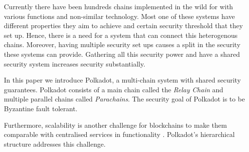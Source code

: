 Currently there have been hundreds chains implemented in the wild for with various functions and non-similar technology.
Most one of these systems have different properties they aim to achieve and certain security threshold that they set up.
Hence, there is a need for a system that can connect this heterogenous chains.
Moreover, having multiple security set ups causes a split in the security these systems can provide.
Gathering all this security power and have a shared security system increases security substantially.

In this paper we introduce Polkadot, a multi-chain system with shared security guarantees.
Polkadot consists of a main chain called the \emph{Relay Chain} and multiple parallel chains called \emph{Parachains}.
The security goal of Polkadot is to be Byzantine fault tolerant.

Furthermore, scalability is another challenge for blockchains to make them comparable with centralised services in functionality .
Polkadot's hierarchical structure addresses this challenge.

